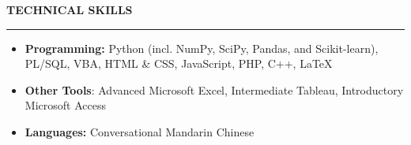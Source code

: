 \documentclass[11pt,letterpaper]{article}
\newcommand{\sectline}{\vspace{4pt}\hrule height 1.5pt\vspace{4pt}}
\newcommand{\sectspace}{\vspace{9pt}}
\begin{document}

\sectspace


\textbf{TECHNICAL SKILLS}\sectline
\begin{itemize}
	\item \textbf{Programming:} Python (incl. NumPy, SciPy, Pandas, and Scikit-learn), PL/SQL, VBA, HTML \& CSS, JavaScript, PHP, C++, \LaTeX
	\item \textbf{Other Tools}: Advanced Microsoft Excel, Intermediate Tableau, Introductory Microsoft Access
	\item \textbf{Languages:} Conversational Mandarin Chinese
\end{itemize}
\end{document}
